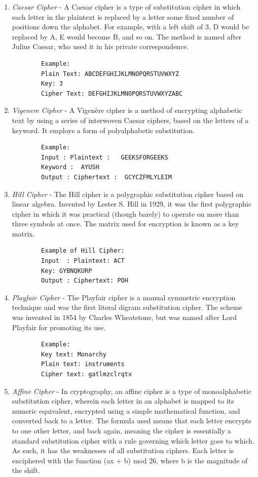 \documentclass[openany]{book}
\begin{document}
\begin{enumerate}
	\item \textit{Caesar Cipher} - A Caesar cipher is a type of substitution cipher in which each letter in the plaintext is replaced by a letter some fixed number of positions down the alphabet. For example, with a left shift of 3, D would be replaced by A, E would become B, and so on. The method is named after Julius Caesar, who used it in his private correspondence.

	      \begin{verbatim}
		Example:
		Plain Text: ABCDEFGHIJKLMNOPQRSTUVWXYZ
		Key: 3
		Cipher Text: DEFGHIJKLMNOPQRSTUVWXYZABC
	\end{verbatim}
	\item \textit{Vigenere Cipher} - A Vigenère cipher is a method of encrypting alphabetic text by using a series of interwoven Caesar ciphers, based on the letters of a keyword. It employs a form of polyalphabetic substitution.

	      \begin{verbatim}
		Example:
		Input : Plaintext :   GEEKSFORGEEKS
		Keyword :  AYUSH
		Output : Ciphertext :  GCYCZFMLYLEIM
	\end{verbatim}

	\item \textit{Hill Cipher} - The Hill cipher is a polygraphic substitution cipher based on linear algebra. Invented by Lester S. Hill in 1929, it was the first polygraphic cipher in which it was practical (though barely) to operate on more than three symbols at once. The matrix used for encryption is known as a key matrix.
	      \begin{verbatim}
		Example of Hill Cipher:
		Input  : Plaintext: ACT
		Key: GYBNQKURP
		Output : Ciphertext: POH

	\end{verbatim}
	\item \textit{Playfair Cipher} - The Playfair cipher is a manual symmetric encryption technique and was the first literal digram substitution cipher. The scheme was invented in 1854 by Charles Wheatstone, but was named after Lord Playfair for promoting its use.

	      \begin{verbatim}
		Example:
		Key text: Monarchy
		Plain text: instruments
		Cipher text: gatlmzclrqtx
	\end{verbatim}


	\item \textit{Affine Cipher} - In cryptography, an affine cipher is a type of monoalphabetic substitution cipher, wherein each letter in an alphabet is mapped to its numeric equivalent, encrypted using a simple mathematical function, and converted back to a letter. The formula used means that each letter encrypts to one other letter, and back again, meaning the cipher is essentially a standard substitution cipher with a rule governing which letter goes to which. As such, it has the weaknesses of all substitution ciphers. Each letter is enciphered with the function (ax + b) mod 26, where b is the magnitude of the shift.


\end{enumerate}
\end{document}
